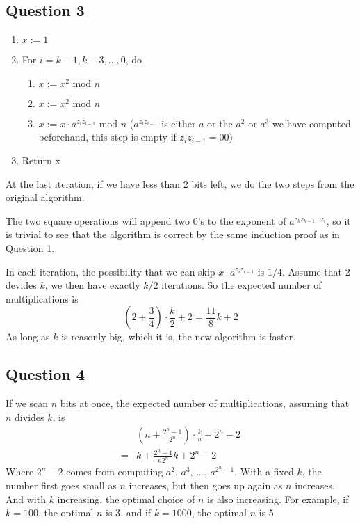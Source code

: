 \documentclass{article}
\begin{document}
\subsection*{Question 3}
\begin{enumerate}
    \item $x:=1$
    \item For $i=k-1, k-3, ... ,0$, do
          \begin{enumerate}
              \item $x := x^2 \text{ mod } n$
              \item $x := x^2 \text{ mod } n$
              \item $x := x \cdot a^{z_i z_{i-1}} \text{ mod } n$
                    ($a^{z_i z_{i-1}}$ is either $a$ or the $a^2$ or $a^3$ we have computed beforehand, this step is empty if $z_i z_{i-1}=00$)
          \end{enumerate}
    \item Return x
\end{enumerate}
At the last iteration, if we have less than 2 bits left, we do the two steps from the original algorithm.

The two square operations will append two 0's to the exponent of $a^{z_k z_{k-1} ... z_i}$, so it is trivial
to see that the algorithm is correct by the same induction proof as in Question 1.

In each iteration, the possibility that we can skip $x \cdot a^{z_i z_{i-1}}$ is $1/4$.
Assume that 2 devides $k$, we then have exactly $k/2$ iterations. So the expected number of multiplications is
$$(2 + \frac{3}{4}) \cdot \frac{k}{2} + 2 = \frac{11}{8}k + 2$$
As long as $k$ is reasonly big, which it is, the new algorithm is faster.

\subsection*{Question 4}

If we scan $n$ bits at once, the expected number of multiplications, assuming that $n$ divides $k$, is
\begin{equation*}
    \begin{split}
        &(n + \frac{2^n-1}{2^n}) \cdot \frac{k}{n} + 2^n - 2 \\
        =& k + \frac{2^n - 1}{n 2^n}k + 2^n - 2
    \end{split}
\end{equation*}
Where $2^n - 2$ comes from computing $a^2$, $a^3$, ..., $a^{2^n-1}$.
With a fixed $k$, the number first goes small as $n$ increases, but then goes up again as $n$ increases.
And with $k$ increasing, the optimal choice of $n$ is also increasing.
For example, if $k=100$, the optimal $n$ is 3, and if $k=1000$, the optimal $n$ is 5.
\end{document}
